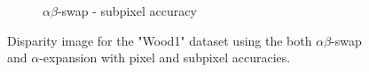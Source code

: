 \documentclass[letterpaper, 10 pt, conference]{ieeeconf}  %
\begin{document}
\begin{figure}[t]
\begin{subfigure}[b]{0.3\textwidth}
                \caption{$\alpha\beta$-swap - subpixel accuracy}
                \label{fig:farm}
        \end{subfigure}
        \caption{Disparity image for the "Wood1" dataset using the both $\alpha\beta$-swap and $\alpha$-expansion with pixel and subpixel accuracies.}
        \label{wood1}
\end{figure}


 

\end{document}
